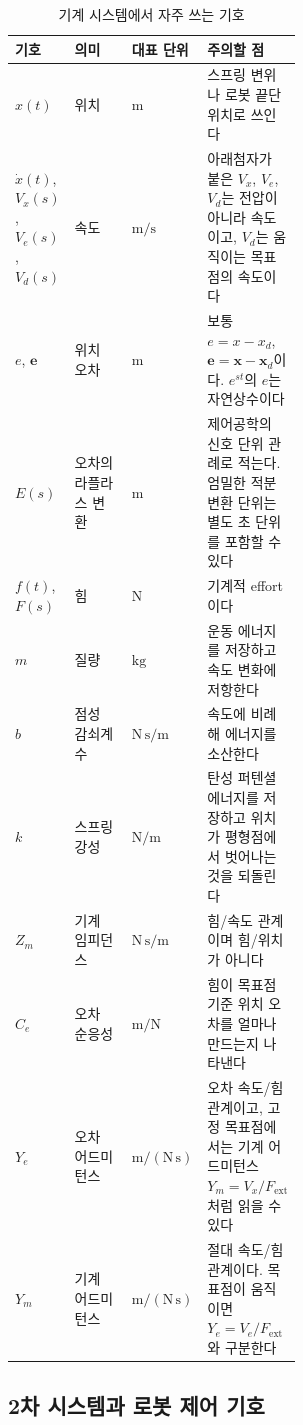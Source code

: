 \begin{table}[H]
  \centering
  \caption{기계 시스템에서 자주 쓰는 기호}
  \small
  \setlength{\tabcolsep}{4pt}
  \begin{tabularx}{\linewidth}{@{}>{\raggedright\arraybackslash}p{0.16\linewidth}>{\raggedright\arraybackslash}p{0.26\linewidth}>{\raggedright\arraybackslash}p{0.15\linewidth}>{\raggedright\arraybackslash}X@{}}
    \toprule
    기호 & 의미 & 대표 단위 & 주의할 점 \\
    \midrule
    $x(t)$ & 위치 & $\mathrm{m}$ & 스프링 변위나 로봇 끝단 위치로 쓰인다 \\
    $\dot{x}(t)$, $V_x(s)$, $V_e(s)$, $V_d(s)$ & 속도 & $\mathrm{m/s}$ & 아래첨자가 붙은 $V_x$, $V_e$, $V_d$는 전압이 아니라 속도이고, $V_d$는 움직이는 목표점의 속도이다 \\
    $e$, $\bm{e}$ & 위치 오차 & $\mathrm{m}$ & 보통 $e=x-x_d$, $\bm{e}=\bm{x}-\bm{x}_d$이다. $e^{st}$의 $e$는 자연상수이다 \\
    $E(s)$ & 오차의 라플라스 변환 & $\mathrm{m}$ & 제어공학의 신호 단위 관례로 적는다. 엄밀한 적분 변환 단위는 별도 초 단위를 포함할 수 있다 \\
    $f(t)$, $F(s)$ & 힘 & $\mathrm{N}$ & 기계적 effort이다 \\
    $m$ & 질량 & $\mathrm{kg}$ & 운동 에너지를 저장하고 속도 변화에 저항한다 \\
    $b$ & 점성 감쇠계수 & $\mathrm{N\,s/m}$ & 속도에 비례해 에너지를 소산한다 \\
    $k$ & 스프링 강성 & $\mathrm{N/m}$ & 탄성 퍼텐셜 에너지를 저장하고 위치가 평형점에서 벗어나는 것을 되돌린다 \\
    $Z_m$ & 기계 임피던스 & $\mathrm{N\,s/m}$ & 힘/속도 관계이며 힘/위치가 아니다 \\
    $C_e$ & 오차 순응성 & $\mathrm{m/N}$ & 힘이 목표점 기준 위치 오차를 얼마나 만드는지 나타낸다 \\
    $Y_e$ & 오차 어드미턴스 & $\mathrm{m/(N\,s)}$ & 오차 속도/힘 관계이고, 고정 목표점에서는 기계 어드미턴스 $Y_m=V_x/F_{\mathrm{ext}}$처럼 읽을 수 있다 \\
    $Y_m$ & 기계 어드미턴스 & $\mathrm{m/(N\,s)}$ & 절대 속도/힘 관계이다. 목표점이 움직이면 $Y_e=V_e/F_{\mathrm{ext}}$와 구분한다 \\
    \bottomrule
  \end{tabularx}
\end{table}

\subsection{2차 시스템과 로봇 제어 기호}

